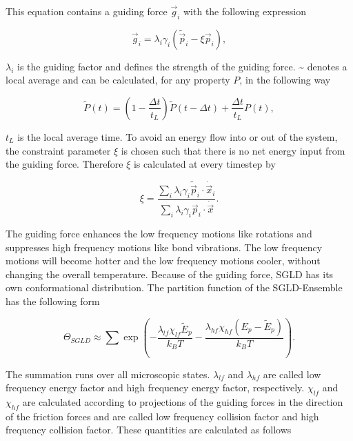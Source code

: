 \documentclass[a4paper]{article}
\begin{document}
This equation contains a guiding force $\vec{g}_i$ with the following expression

\begin{equation}
\vec{g}_i = \lambda_i \gamma_i (\tilde{\vec{p}}_i - \xi \vec{p}_i),
\label{eq:guiding_force}
\end{equation}

$\lambda_i$ is the guiding factor and defines the strength of the guiding force. \~{} denotes a local average and can be calculated, for any property $P$, in the following way

\begin{equation}
\tilde{P}(t) = \left( 1 - \frac{\Delta t}{t_L} \right) \tilde{P}(t - \Delta t) + \frac{\Delta t}{t_L} P(t),
\label{eq:local_average}
\end{equation}

$t_L$ is the local average time. To avoid an energy flow into or out of the system, the constraint parameter $\xi$ is chosen such that there is no net energy input from the guiding force. Therefore $\xi$ is calculated at every timestep by

\begin{equation}
\xi = \frac{\sum_i \lambda_i \gamma_i \tilde{\vec{p}}_i \cdot \dot{\vec{x}}_i}{\sum_i \lambda_i \gamma_i \vec{p}_i \cdot \dot{\vec{x}}}.
\label{eq:constraint_parameter}
\end{equation}

The guiding force enhances the low frequency motions like rotations and suppresses high frequency motions like bond vibrations. The low frequency motions will become hotter and the low frequency motions cooler, without changing the overall temperature. Because of the guiding force, SGLD has its own conformational distribution. The partition function of the SGLD-Ensemble has the following form~\cite{XiongwuWu2011a} 

\begin{equation}
\Theta_{SGLD} \approx \sum \exp \left( - \frac{\lambda_{lf} \chi_{lf} \tilde{E}_p}{k_B T} - \frac{\lambda_{hf} \chi_{hf}(E_p - \tilde{E}_p)}{k_B T} \right).
\label{eq:partition_function_sgld}
\end{equation}

The summation runs over all microscopic states. $\lambda_{lf}$ and $\lambda_{hf}$ are called low frequency energy factor and high frequency energy factor, respectively. $\chi_{lf}$ and $\chi_{hf}$ are calculated according to projections of the guiding forces in the direction of the friction forces and are called low frequency collision factor and high frequency collision factor. These quantities are calculated as follows
\end{document}
